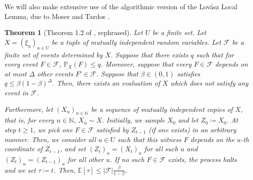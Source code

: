 \documentclass[notitlepage]{scrartcl}
\newtheorem{theorem}{Theorem}
\begin{document}
We will also make extensive use of the algorithmic version of the Lov\'asz Local Lemma, due to Moser and Tardos \cite{MT10}. 
\begin{theorem}[Theorem 1.2 of \cite{MT10}, rephrased]\label{th: LLL}
Let $U$ be a finite set. Let $X=(\xi_u)_{u\in U}$ be a tuple of mutually independent random variables. Let $\mathcal{F}$ be a finite set of events determined by $X$. Suppose that there exists $q$ such that for every event $F\in \mathcal{F}$, $\mathbb{P}_X(F)\le q$. Moreover, suppose that every $F\in \mathcal{F}$ depends on at most $\Delta$ other events $F'\in \mathcal{F}$. Suppose that $\beta\in (0,1)$ satisfies $q\le \beta(1-\beta)^{\Delta}$. Then, there exists an evaluation of $X$ which does not satisfy any event in $\mathcal{F}$. 

Furthermore, let $(X_n)_{n\in \mathbb{N}}$ be a sequence of mutually independent copies of $X$, that is, for every $n\in \mathbb{N}$, $X_n\sim X$. Initially, we sample $X_0$ and let $Z_0\coloneqq X_0$. At step $t\ge 1$, we pick one $F\in \mathcal{F}$ satisfied by $Z_{t-1}$  (if one exists) in an arbitrary manner. Then, we consider all $u\in U$ such that this witness $F$ depends on the $u$-th coordinate of $Z_{t-1}$, and set $(Z_t)_u=(X_t)_u$ for all such $u$ and $(Z_t)_u=(Z_{t-1})_u$ for all other $u$. If no such $F \in \mathcal{F}$ exists, the process halts and we set $\tau\coloneqq t$. Then, $\mathbb{E}\left[\tau\right]\le |\mathcal{F}|\frac{\beta}{1-\beta}$.
\end{theorem}
\end{document}
